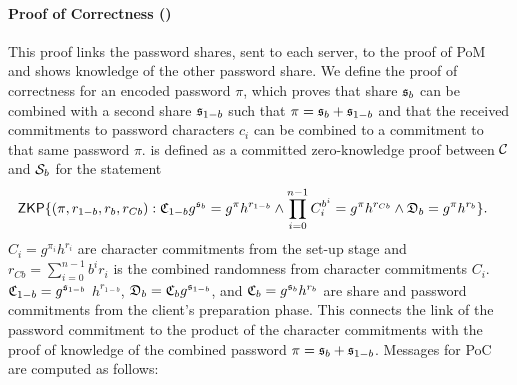 \paragraph{Proof of Correctness (\PoC)}
This proof links the password shares, sent to each server, to the proof of \ac{PoM} and shows knowledge of the other password share.
We define the proof of correctness for an encoded password $\pi$, which proves that share $\mathfrak{s}_{b}$ can be combined with a second share $\mathfrak{s}_{1-b}$ such that $\pi=\mathfrak{s}_{b}+\mathfrak{s}_{1-b}$ and that the received commitments to password characters $c_i$ can be combined to a commitment to that same password $\pi$.
\PoC is defined as a committed zero-knowledge proof between $\mathcal{C}$ and $\mathcal{S}_b$ for the statement
\begin{align*}
&\mathsf{ZKP}\{(\pi,r_{1-b},r_b,r_{Cb}): \mathfrak{C}_{1-b}g^{\mathfrak{s}_{b}}=g^{\pi}h^{r_{1-b}}  \wedge  \prod_{i=0}^{n-1}C_i^{b^i}=g^{\pi}h^{r_{Cb}}  \wedge  \mathfrak{D}_{b}=g^{\pi}h^{r_{b}}\}. 
\end{align*}
$C_i=g^{\pi_i}h^{r_i}$ are character commitments from the set-up stage and $r_{Cb}=\sum_{i=0}^{n-1}b^i r_i$ is the combined randomness from character commitments $C_i$.
$\mathfrak{C}_{1-b}=g^{\mathfrak{s}_{1-b}}$ $h^{r_{1-b}}$, $\mathfrak{D}_{b}=\mathfrak{C}_{b}g^{\mathfrak{s}_{1-b}}$, and $\mathfrak{C}_{b}=g^{\mathfrak{s}_{b}}h^{r_{b}}$ are share and password commitments from the client's preparation phase.
This connects the link of the password commitment to the product of the character commitments with the proof of knowledge of the combined password $\pi=\mathfrak{s}_b+\mathfrak{s}_{1-b}$.
Messages for \ac{PoC} are computed as follows:

